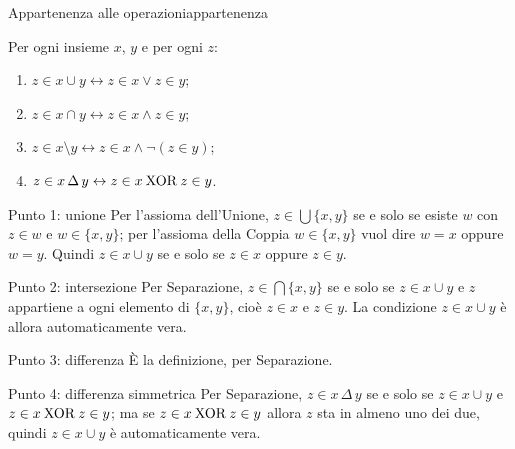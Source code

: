 \begin{concetto}
\begin{Proposizione}{Appartenenza alle operazioni}{appartenenza}
    \begin{prerequisiti}
    \end{prerequisiti}
    Per ogni insieme $x$, $y$ e per ogni $z$:
    \begin{enumerate}
        \item $z \in x \cup y \leftrightarrow z \in x \vee z \in y$;
        \item $z \in x \cap y \leftrightarrow z \in x \wedge z \in y$;
        \item $z \in x \setminus y \leftrightarrow z \in x \wedge \neg(z \in y)$;
        \item $z \in x \,\Delta\, y \leftrightarrow z \in x \mathbin{\mathrm{XOR}} z \in y$.
    \end{enumerate}
\end{Proposizione}
\begin{dimostrazione}
    \begin{caso}{Punto 1: unione}
        Per l'assioma dell'Unione, $z \in \bigcup\{x, y\}$ se e solo se esiste $w$ con $z \in w$ e $w \in \{x, y\}$;
        per l'assioma della Coppia $w \in \{x,y\}$ vuol dire $w = x$ oppure $w = y$. Quindi $z \in x \cup y$ se e solo se
        $z \in x$ oppure $z \in y$.
    \end{caso}
    \begin{caso}{Punto 2: intersezione}
        Per Separazione, $z \in \bigcap\{x, y\}$ se e solo se $z \in x \cup y$ e $z$ appartiene a ogni elemento di
        $\{x, y\}$, cioè $z \in x$ e $z \in y$. La condizione $z \in x \cup y$ è allora automaticamente vera.
    \end{caso}
    \begin{caso}{Punto 3: differenza}
        È la definizione, per Separazione.
    \end{caso}
    \begin{caso}{Punto 4: differenza simmetrica}
        Per Separazione, $z \in x \,\Delta\, y$ se e solo se $z \in x \cup y$ e $z \in x \mathbin{\mathrm{XOR}} z \in y$; ma se
        $z \in x \mathbin{\mathrm{XOR}} z \in y$ allora $z$ sta in almeno uno dei due, quindi $z \in x \cup y$ è automaticamente vera.
    \end{caso}
\end{dimostrazione}
\end{concetto}


